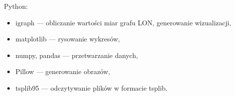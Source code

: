 Python:
\begin{itemize}
    \item igraph --- obliczanie wartości miar grafu LON, generowanie wizualizacji,
    \item matplotlib --- rysowanie wykresów,
    \item numpy, pandas --- przetwarzanie danych,
    \item Pillow --- generowanie obrazów,
    \item tsplib95 --- odczytywanie plików w formacie tsplib.
\end{itemize}

